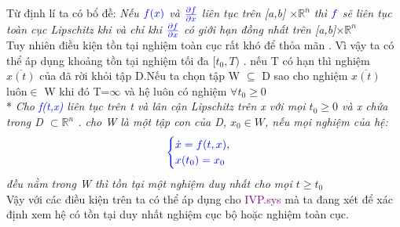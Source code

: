 \documentclass[a4paper]{article}
\begin{document}
    Từ định lí ta có bổ đề: \textit{Nếu $\textcolor{blue}{f(x)}$ và $\textcolor{blue}{\frac{\partial f}{\partial x}}$ liên tục trên [a,b] $\times \mathbb{R}^{n}$ thì $\textcolor{blue}{f}$ sẽ liên tục toàn cục Lipschitz khi và chỉ khi $\textcolor{blue}{\frac{\partial f}{\partial x}}$ có giới hạn đồng nhất trên [a,b]$\times \mathbb{R}^{n}$}
    \\Tuy nhiên điều kiện tồn tại nghiệm toàn cục rất khó để thỏa mãn . Vì vậy ta có thể áp dụng khoảng tồn tại nghiệm tối đa $[t_0,T)$ . nếu T có hạn thì nghiệm $\overline{x(t)}$ của đã rời khỏi tập D.Nếu ta chọn tập W $\subseteq $ D sao cho nghiệm $\overline{x(t)}$ luôn$ \in$ W khi đó T=$\infty$ và hệ luôn có nghiệm $\forall t_0 \geq 0$ \\
    * \textit{Cho \textcolor{blue}{f(t,x)} liên tục trên t và lân cận Lipschitz trên x với mọi $ t_0 \geq 0 $ và x chứa trong D $\subset \mathbb{R}^{n}$ . 
    cho W là một tập con của D, $x_0 \in W$, nếu mọi nghiệm của hệ:
    \begin{align*}
        \textcolor{blue}{
        \begin{cases}
            \dot x= f(t,x) \textcolor{black}{,}\\
            x(t_0)=x_0
        \end{cases}}
    \end{align*}
    đều nằm trong W thì tồn tại một nghiệm duy nhất cho mọi $t \geq t_0$}\\
    Vậy với các điều kiện trên ta có thể áp dụng cho \textcolor{purple}{IVP.sys} mà ta đang xét để xác định xem hệ có tồn tại duy nhất nghiệm cục bộ hoặc nghiệm toàn cục.
\end{document}
